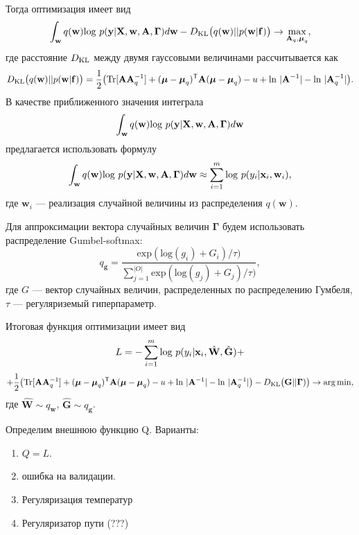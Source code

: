 \documentclass[12pt]{article}
\DeclareMathOperator*{\argmin}{arg\,min}
\begin{document}
Тогда оптимизация имеет вид
\begin{equation}
\label{eq:norm_max}
 \int_{\mathbf{w}} q(\mathbf{w})\textnormal{log}~{p(\mathbf{y}|\mathbf{X},\mathbf{w},\mathbf{A},\boldsymbol{\Gamma})} d \mathbf{w} - D_\textnormal{KL}\bigl(q (\mathbf{w} )|| p (\mathbf{w}|\mathbf{f})\bigr) \to \max_{\mathbf{A}_q, \boldsymbol{\mu}_q},
\end{equation}
где расстояние $D_\textnormal{KL}$ между двумя гауссовыми величинами рассчитывается как 
\[
	D_\textnormal{KL}\bigl(q (\mathbf{w}) || p (\mathbf{w}|\mathbf{f})\bigr) = \frac{1}{2} \bigl( \textnormal{Tr} [\mathbf{A}\mathbf{A}^{-1}_q] + (\boldsymbol{\mu} - \boldsymbol{\mu}_q)^\mathsf{T}\mathbf{A}(\boldsymbol{\mu} - \boldsymbol{\mu}_q) - u +\textnormal{ln}~|\mathbf{A}^{-1}| - \textnormal{ln}~|\mathbf{A}_q^{-1}| \bigr).
\]
В качестве приближенного значения интеграла $$\int_{\mathbf{w}} q(\mathbf{w})\textnormal{log}~{p(\mathbf{y}|\mathbf{X},\mathbf{w},\mathbf{A},\boldsymbol{\Gamma})} d \mathbf{w}$$ предлагается использовать формулу
\[
\int_{\mathbf{w}} q(\mathbf{w})\textnormal{log}~{p(\mathbf{y}|\mathbf{X},\mathbf{w},\mathbf{A},\boldsymbol{\Gamma})} d \mathbf{w} \approx \sum_{i=1}^m \textnormal{log}~p({y}_i|\mathbf{x}_i, \mathbf{w}_i),
\]
где $\mathbf{w}_i$  --- реализация случайной величины из распределения $q(\mathbf{w})$.

Для аппроксимации вектора случайных величин $\boldsymbol{\Gamma}$ будем использовать распределение Gumbel-softmax:
\[
    q_\mathbf{g} = \frac{\text{exp}(\text{log}(g_i) + G_i)/\tau)}{\sum_{j=1}^{|O|}\text{exp}(\text{log}(g_j) + G_j)/\tau)},
\]
где $G$ --- вектор случайных величин, распределенных по распределению Гумбеля, $\tau$ --- регуляриземый гиперпараметр.


Итоговая функция оптимизации имеет вид
\[
	L = -\sum_{i=1}^m \textnormal{log}~p({y}_i|\mathbf{x}_i, \hat{\mathbf{W}}, \hat{\mathbf{G}}) + 
\]
\[
+\frac{1}{2} \bigl( \textnormal{Tr} [\mathbf{A}\mathbf{A}^{-1}_q] + (\boldsymbol{\mu} - \boldsymbol{\mu}_q)^\mathsf{T}\mathbf{A}(\boldsymbol{\mu} - \boldsymbol{\mu}_q) - u +\textnormal{ln}~|\mathbf{A}^{-1}| - \textnormal{ln}~|\mathbf{A}_q^{-1}| \bigr) -D_\textnormal{KL}\bigl(\mathbf{G} || \boldsymbol{\Gamma})\bigr) \to \argmin,
\]
где $\hat{\mathbf{W}} \sim q_\mathbf{w}$, $\hat{\mathbf{G}} \sim q_\mathbf{g}$.


Определим внешнюю функцию Q. Варианты:
\begin{enumerate}
\item $Q = L$.
\item ошибка на валидации.
\item Регуляризация температур
\item Регуляризатор пути (???)
\end{enumerate}
\end{document}
